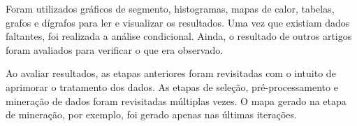 Foram utilizados gráficos de segmento, histogramas, mapas de calor, tabelas, grafos e dígrafos para ler e visualizar os resultados. Uma vez que existiam dados faltantes, foi realizada a análise condicional. Ainda, o resultado de outros artigos foram avaliados para verificar o que era observado.

Ao avaliar resultados, as etapas anteriores foram revisitadas com o intuito de aprimorar o tratamento dos dados. As etapas de seleção, pré-processamento e mineração de dados foram revisitadas múltiplas vezes. O mapa gerado na etapa de mineração, por exemplo, foi gerado apenas nas últimas iterações.

